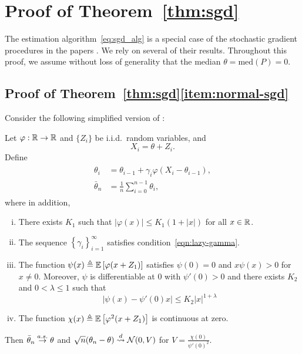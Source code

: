 \section{Proof of Theorem~\ref{thm:sgd}}
\label{proof:sgd}

The estimation algorithm~\eqref{eq:sgd_alg} is a special
case of the stochastic gradient procedures in the papers
\cite{PolyakJu92, polyak1990new}.
We rely on several of their results. Throughout this proof,
we assume without loss of generality that the median
$\theta = \mbox{med}(P) = 0$.

\subsection{Proof of Theorem~\ref{thm:sgd}\eqref{item:normal-sgd}}
\label{sec:proof-normal-sgd}

Consider the following simplified version of
\cite[Thm. 4]{polyak1992acceleration}:
\begin{corollary}{\cite[Thms. 3 \& 4]{PolyakJu92}}
  \label{corollary:polyak-juditsky}
  Let $\varphi : \mathbb{R} \to \mathbb{R}$ and $\{Z_i\}$ be i.i.d.\ random
  variables, and
  \begin{equation*}
  X_i = \theta + Z_i.
  \end{equation*}
  Define
  \begin{align}
    \begin{split}
      \theta_i & = \theta_{i-1} + \gamma_i \varphi(X_i - \theta_{i-1}), \\
      \bar{\theta}_n & = \frac{1}{n} \sum_{i=0}^{n-1} \theta_i, 
    \end{split}
    \label{eq:Polyak_Juditsky_alg}
  \end{align}
  where in addition,
  \begin{enumerate}[(i)]
  \item There exists $K_1$ such that $\left| \varphi(x) \right| \leq
    K_1(1+|x|)$ for all $x\in \mathbb{R}$.
  \item The sequence $\left\{ \gamma_i \right\}_{i=1}^\infty$ satisfies
    condition~\eqref{eqn:lazy-gamma}.
  \item \label{item:zero-gradient}
    The function $\psi(x) \triangleq \mathbb{E}\left[  \varphi(x+Z_1)\right]$
    satisfies $\psi(0) = 0$ and
    $x\psi(x) > 0$ for $x\neq 0$.  Moreover, $\psi$ is differentiable
    at 0 with $\psi'(0) > 0$ and there exists
    $K_2$ and $0 < \lambda \leq 1$ such that
    \begin{equation}
      \label{eqn:local-hessian-psi}
        \left| \psi(x) - \psi'(0)x \right|\leq K_2 |x|^{1+\lambda}
    \end{equation}
  \item The function 
    $\chi(x) \triangleq \mathbb{E}\left[ \varphi^2(x+Z_1)\right]$ is continuous at zero. 
  \end{enumerate}
  Then $\bar{\theta}_n \stackrel{a.s.}{\rightarrow} \theta$ and $ \sqrt{n}({\theta}_n - \theta)
  \stackrel{d}{\rightsquigarrow} \mathcal{N}(0,V)$ for
  $V = \frac{ \chi(0)} {\psi'(0)^2}$.
\end{corollary}

